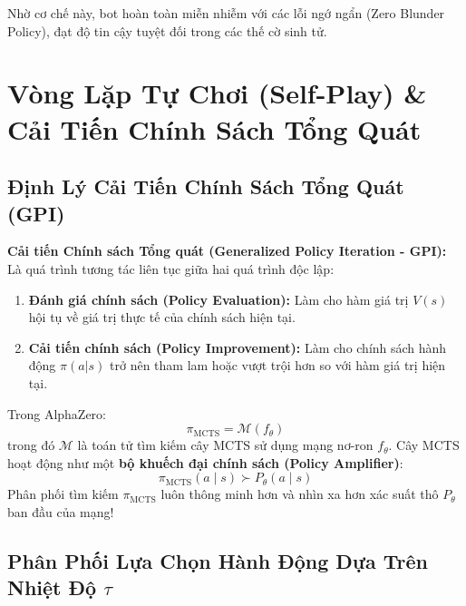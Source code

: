 \documentclass[12pt,a4paper,oneside]{report}
\begin{document}
Nhờ cơ chế này, bot hoàn toàn miễn nhiễm với các lỗi ngớ ngẩn (Zero Blunder Policy), đạt độ tin cậy tuyệt đối trong các thế cờ sinh tử.

\chapter{Vòng Lặp Tự Chơi (Self-Play) \& Cải Tiến Chính Sách Tổng Quát}

\section{Định Lý Cải Tiến Chính Sách Tổng Quát (GPI)}

\begin{definition}
\textbf{Cải tiến Chính sách Tổng quát (Generalized Policy Iteration - GPI):} Là quá trình tương tác liên tục giữa hai quá trình độc lập:
\begin{enumerate}
    \item \textbf{Đánh giá chính sách (Policy Evaluation):} Làm cho hàm giá trị $V(s)$ hội tụ về giá trị thực tế của chính sách hiện tại.
    \item \textbf{Cải tiến chính sách (Policy Improvement):} Làm cho chính sách hành động $\pi(a|s)$ trở nên tham lam hoặc vượt trội hơn so với hàm giá trị hiện tại.
\end{enumerate}
\end{definition}

Trong AlphaZero:
\begin{equation}
    \pi_{\text{MCTS}} = \mathcal{M}(f_\theta)
\end{equation}
trong đó $\mathcal{M}$ là toán tử tìm kiếm cây MCTS sử dụng mạng nơ-ron $f_\theta$. Cây MCTS hoạt động như một \textbf{bộ khuếch đại chính sách (Policy Amplifier)}:
\begin{equation}
    \pi_{\text{MCTS}}(a \mid s) \succ P_\theta(a \mid s)
\end{equation}
Phân phối tìm kiếm $\pi_{\text{MCTS}}$ luôn thông minh hơn và nhìn xa hơn xác suất thô $P_\theta$ ban đầu của mạng!

\section{Phân Phối Lựa Chọn Hành Động Dựa Trên Nhiệt Độ \texorpdfstring{$\tau$}{Tau}}
\end{document}
